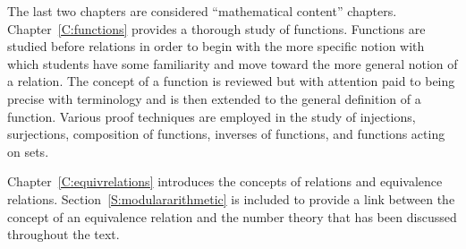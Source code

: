 The last two chapters are considered ``mathematical content'' chapters.  
Chapter~\ref{C:functions} provides a thorough study of functions.  Functions are studied before relations in order to begin with the more specific notion with which students have some familiarity and move toward the more general notion of a relation.  The concept of a function is reviewed but with attention paid to being precise with terminology and is then extended to the general definition of a function.  Various proof techniques are employed in the study of injections, surjections, composition of functions,  inverses of functions, and functions acting on sets.  

Chapter~\ref{C:equivrelations} introduces the concepts of relations and equivalence relations.  %
Section~\ref{S:modulararithmetic} is included to provide a link between the concept of an equivalence relation and the number theory that has been discussed throughout the text.  

%

